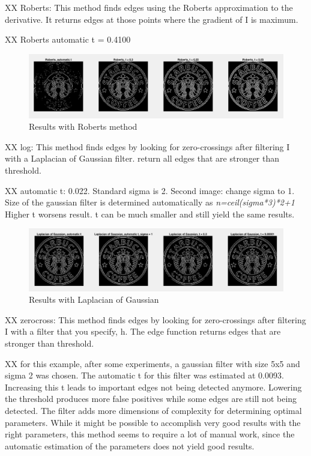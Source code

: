 XX Roberts: This method finds edges using the Roberts approximation to the derivative. It returns edges at those points where the gradient of I is maximum.

XX Roberts automatic t = 0.4100

\begin{figure}[!hbt]
  \includegraphics[width=\textwidth]{./img/ex1/im3.png}
  \caption{Results with Roberts method}
  \label{fig:im3}
\end{figure}

XX log: This method finds edges by looking for zero-crossings after filtering I with a Laplacian of Gaussian filter. return all edges that are stronger than threshold.

XX automatic t: 0.022. Standard sigma is 2. Second image: change sigma to 1. Size of the gaussian filter is determined automatically as \textit{n=ceil(sigma*3)*2+1} Higher t worsens result. t can be much smaller and still yield the same results.

\begin{figure}[!hbt]
  \includegraphics[width=\textwidth]{./img/ex1/im4.png}
  \caption{Results with Laplacian of Gaussian}
  \label{fig:im4}
\end{figure}

XX zerocross: This method finds edges by looking for zero-crossings after filtering I with a filter that you specify, h. The edge function returns edges that are stronger than threshold.

XX for this example, after some experiments, a gaussian filter with size 5x5 and sigma 2 was chosen. The automatic t for this filter was estimated at 0.0093. Increasing this t leads to important edges not being detected anymore. Lowering the threshold produces more false positives while some edges are still not being detected. The filter adds more dimensions of complexity for determining optimal parameters. While it might be possible to accomplish very good results with the right parameters, this method seems to require a lot of manual work, since the automatic estimation of the parameters does not yield good results.

